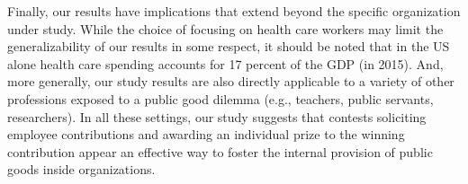 \documentclass[12pt, titlepage]{article}
\begin{document}
Finally, our results have implications that extend beyond the specific
organization under study. While the choice of focusing on health care
workers may limit the generalizability of our results in some respect,
it should be noted that in the US alone health care spending accounts
for 17 percent of the GDP (in 2015). And, more generally, our study
results are also directly applicable to a variety of other professions
exposed to a public good dilemma (e.g., teachers, public servants,
researchers). In all these settings, our study suggests that contests
soliciting employee contributions and awarding an individual prize to
the winning contribution appear an effective way to foster the internal
provision of public goods inside organizations.

\renewcommand\refname{References}

\end{document}
